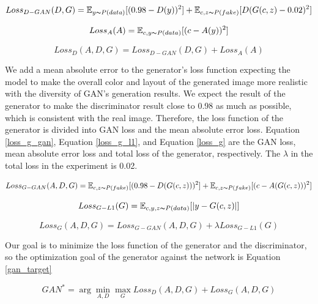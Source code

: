 \begin{equation}
    Loss_{D-GAN}(D,G)=
    \mathbb{E}_{y\thicksim P(data)}[(0.98-D(y))^2]+
    \mathbb{E}_{c,z\thicksim P(fake)}[D(G(c,z)-0.02)^2]
    \label{loss_d_gan}
\end{equation}


\begin{equation}
    Loss_{A}(A)=
    \mathbb{E}_{c,y\thicksim P(data)}[(c-A(y))^2]
    \label{loss_d_a}
\end{equation}

\begin{equation}
    Loss_{D}(A,D,G)=
    Loss_{D-GAN}(D,G)+
    Loss_{A}(A)
    \label{loss_d}
\end{equation}

We add a mean absolute error to the generator's loss function expecting the model to make the overall color and layout of the generated image more realistic with the diversity of GAN's generation results.
We expect the result of the generator to make the discriminator result close to 0.98 as much as possible, which is consistent with the real image.
Therefore, the loss function of the generator is divided into GAN loss and the mean absolute error loss.
Equation \eqref{loss_g_gan}, Equation \eqref{loss_g_l1}, and Equation \eqref{loss_g} are the GAN loss, mean absolute error loss and total loss of the generator, respectively.
The $\lambda$ in the total loss in the experiment is 0.02.

\begin{equation}
    Loss_{G-GAN}(A,D,G)=
    \mathbb{E}_{c,z\thicksim P(fake)}[(0.98-D(G(c,z)))^2]+
    \mathbb{E}_{c,z\thicksim P(fake)}[(c-A(G(c,z)))^2]
    \label{loss_g_gan}
\end{equation}

\begin{equation}
    Loss_{G-L1}(G)=
    \mathbb{E}_{c,y,z\thicksim P(data)}[|y-G(c,z)|]
    \label{loss_g_l1}
\end{equation}

\begin{equation}
    Loss_{G}(A,D,G)=
    Loss_{G-GAN}(A,D,G)+
    \lambda Loss_{G-L1}(G)
    \label{loss_g}
\end{equation}

Our goal is to minimize the loss function of the generator and the discriminator, so the optimization goal of the generator against the network is Equation \eqref{gan_target}

\begin{equation}
    GAN^*=\arg \min_{A,D} \max_{G}Loss_{D}(A,D,G)+Loss_{G}(A,D,G)
    \label{gan_target}
\end{equation}


